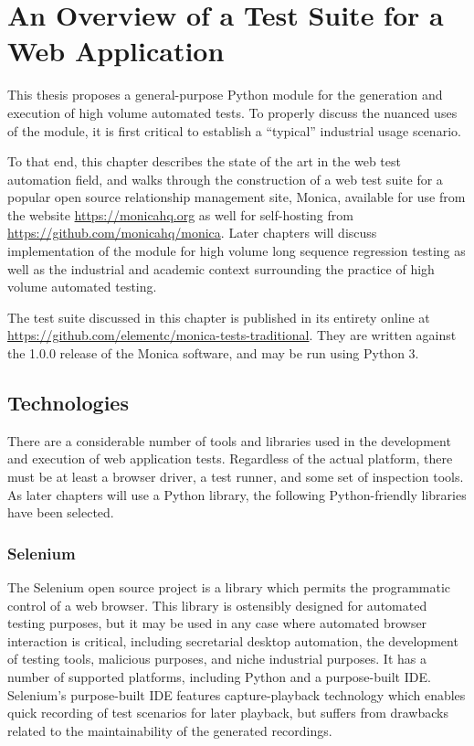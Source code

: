 \chapter{An Overview of a Test Suite for a Web Application}
This thesis proposes a general-purpose Python module for the generation and execution of high volume automated tests. To properly discuss the nuanced uses of the module, it is first critical to establish a ``typical'' industrial usage scenario.

To that end, this chapter describes the state of the art in the web test automation field, and walks through the construction of a web test suite for a popular open source relationship management site, Monica, available for use from the website \url{https://monicahq.org} as well for self-hosting from \url{https://github.com/monicahq/monica}. Later chapters will discuss implementation of the module for high volume long sequence regression testing as well as the industrial and academic context surrounding the practice of high volume automated testing.

The test suite discussed in this chapter is published in its entirety online at \url{https://github.com/elementc/monica-tests-traditional}. They are written against the 1.0.0 release of the Monica software, and may be run using Python 3.

\section{Technologies}
There are a considerable number of tools and libraries used in the development and execution of web application tests.\citep{kaur2013comparative} Regardless of the actual platform, there must be at least a browser driver, a test runner, and some set of inspection tools. As later chapters will use a Python library, the following Python-friendly libraries have been selected.

\subsection{Selenium}
The Selenium open source project is a library which permits the programmatic control of a web browser.\citep{holmes2006automating} This library is ostensibly designed for automated testing purposes\citep{razak2011agile}, but it may be used in any case where automated browser interaction is critical, including secretarial desktop automation, the development of testing tools, malicious purposes, and niche industrial purposes.\citep{kongsli2007security} It has a number of supported platforms, including Python and a purpose-built IDE.\citep{bruns2009web} Selenium's purpose-built IDE features capture-playback technology which enables quick recording of test scenarios for later playback, but suffers from drawbacks related to the maintainability of the generated recordings.\citep{leotta2013capture}\\

